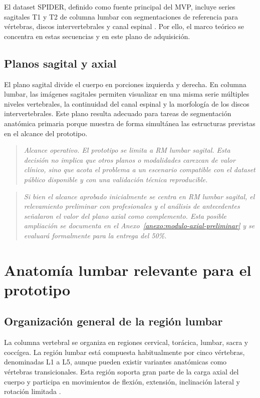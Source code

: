 El dataset SPIDER, definido como fuente principal del MVP, incluye series sagitales T1 y T2 de columna lumbar con segmentaciones de referencia para vértebras, discos intervertebrales y canal espinal \parencite{vandergraaf_spider_2024}. Por ello, el marco teórico se concentra en estas secuencias y en este plano de adquisición.

\subsection{Planos sagital y axial}

El plano sagital divide el cuerpo en porciones izquierda y derecha. En columna lumbar, las imágenes sagitales permiten visualizar en una misma serie múltiples niveles vertebrales, la continuidad del canal espinal y la morfología de los discos intervertebrales. Este plano resulta adecuado para tareas de segmentación anatómica primaria porque muestra de forma simultánea las estructuras previstas en el alcance del prototipo.

\begin{quote}
\itshape
Alcance operativo. El prototipo se limita a RM lumbar sagital. Esta decisión no implica que otros planos o modalidades carezcan de valor clínico, sino que acota el problema a un escenario compatible con el dataset público disponible y con una validación técnica reproducible.
\end{quote}


\begin{quote}
\itshape
Si bien el alcance aprobado inicialmente se centra en RM lumbar sagital, el relevamiento preliminar con profesionales y el análisis de antecedentes señalaron el valor del plano axial como complemento. Esta posible ampliación se documenta en el Anexo~\ref{anexo:modulo-axial-preliminar} y se evaluará formalmente para la entrega del 50\%.
\end{quote}

\section{Anatomía lumbar relevante para el prototipo}

\subsection{Organización general de la región lumbar}

La columna vertebral se organiza en regiones cervical, torácica, lumbar, sacra y coccígea. La región lumbar está compuesta habitualmente por cinco vértebras, denominadas L1 a L5, aunque pueden existir variantes anatómicas como vértebras transicionales. Esta región soporta gran parte de la carga axial del cuerpo y participa en movimientos de flexión, extensión, inclinación lateral y rotación limitada \parencite{standring_grays_2020}.

